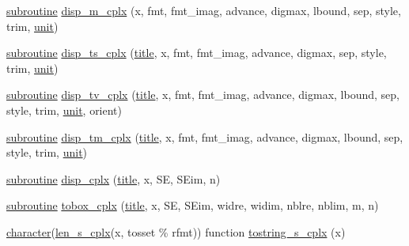 \begin{DoxyCompactItemize}
\item 
\hyperlink{M__stopwatch_83_8txt_acfbcff50169d691ff02d4a123ed70482}{subroutine} \hyperlink{namespacem__display_a86ed603fd65468b46aad9ff127dc517c}{disp\+\_\+m\+\_\+cplx} (x, fmt, fmt\+\_\+imag, advance, digmax, lbound, sep, style, trim, \hyperlink{M__stopwatch_83_8txt_a5cbef30eb7c0d734bd82f5a7ebea9aa7}{unit})
\item 
\hyperlink{M__stopwatch_83_8txt_acfbcff50169d691ff02d4a123ed70482}{subroutine} \hyperlink{namespacem__display_a008a43400dfc972afef14c2c6d1ddbf3}{disp\+\_\+ts\+\_\+cplx} (\hyperlink{print__watch_83_8txt_a15b5bd21156bb9fca6a755ab8c029a9c}{title}, x, fmt, fmt\+\_\+imag, advance, digmax, sep, style, trim, \hyperlink{M__stopwatch_83_8txt_a5cbef30eb7c0d734bd82f5a7ebea9aa7}{unit})
\item 
\hyperlink{M__stopwatch_83_8txt_acfbcff50169d691ff02d4a123ed70482}{subroutine} \hyperlink{namespacem__display_af30a3037ae6a55f77dbe10461a11ad6c}{disp\+\_\+tv\+\_\+cplx} (\hyperlink{print__watch_83_8txt_a15b5bd21156bb9fca6a755ab8c029a9c}{title}, x, fmt, fmt\+\_\+imag, advance, digmax, lbound, sep, style, trim, \hyperlink{M__stopwatch_83_8txt_a5cbef30eb7c0d734bd82f5a7ebea9aa7}{unit}, orient)
\item 
\hyperlink{M__stopwatch_83_8txt_acfbcff50169d691ff02d4a123ed70482}{subroutine} \hyperlink{namespacem__display_a1f26f388bc8d286db185f661f95fe233}{disp\+\_\+tm\+\_\+cplx} (\hyperlink{print__watch_83_8txt_a15b5bd21156bb9fca6a755ab8c029a9c}{title}, x, fmt, fmt\+\_\+imag, advance, digmax, lbound, sep, style, trim, \hyperlink{M__stopwatch_83_8txt_a5cbef30eb7c0d734bd82f5a7ebea9aa7}{unit})
\item 
\hyperlink{M__stopwatch_83_8txt_acfbcff50169d691ff02d4a123ed70482}{subroutine} \hyperlink{namespacem__display_ae6588ffe4d1d6d1022c0b0017f4f70b7}{disp\+\_\+cplx} (\hyperlink{print__watch_83_8txt_a15b5bd21156bb9fca6a755ab8c029a9c}{title}, x, SE, S\+Eim, n)
\item 
\hyperlink{M__stopwatch_83_8txt_acfbcff50169d691ff02d4a123ed70482}{subroutine} \hyperlink{namespacem__display_a95571f3e4015bb187bcc1785c76013f9}{tobox\+\_\+cplx} (\hyperlink{print__watch_83_8txt_a15b5bd21156bb9fca6a755ab8c029a9c}{title}, x, SE, S\+Eim, widre, widim, nblre, nblim, m, n)
\item 
\hyperlink{option__stopwatch_83_8txt_abd4b21fbbd175834027b5224bfe97e66}{character}(\hyperlink{namespacem__display_a7b573fb0cba7c7c954a820cdfe1c7968}{len\+\_\+s\+\_\+cplx}(x, tosset \% rfmt)) function \hyperlink{namespacem__display_ab2141edcb1746f1aa92e31ed07d597a8}{tostring\+\_\+s\+\_\+cplx} (x)

\end{DoxyCompactItemize}
